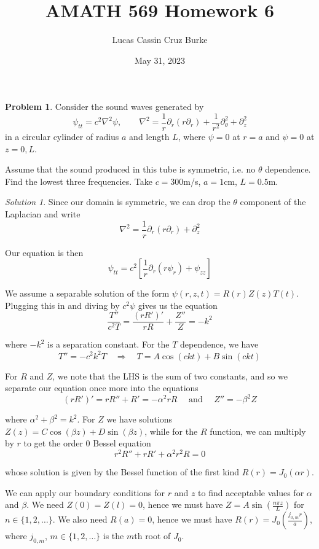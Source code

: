 \documentclass[12pt,a4paper]{article}
\title{AMATH 569 Homework 6}
\author{Lucas Cassin Cruz Burke}
\date{May 31, 2023}
\theoremstyle{definition}
\newtheorem{problem}{Problem}
\theoremstyle{remark}
\newtheorem*{solution}{Solution}
\begin{document}
\maketitle

\begin{problem}
    Consider the sound waves generated by $$\psi_{tt} = c^2 \nabla^2 \psi, \qquad \nabla^2 = \frac{1}{r} \partial_r (r \partial_r) + \frac{1}{r^2}\partial_\theta^2 + \partial_z^2$$
    in a circular cylinder of radius $a$ and length $L$, where $\psi = 0$ at $r=a$ and $\psi=0$ at $z=0, L$. 

    Assume that the sound produced in this tube is symmetric, i.e. no $\theta$ dependence. Find the lowest three frequencies. Take $c=300$m/s, $a = 1$cm, $L =0.5$m. 
\end{problem}
\begin{solution}
    Since our domain is symmetric, we can drop the $\theta$ component of the Laplacian and write $$\nabla^2 = \frac{1}{r}\partial_r (r \partial_r) + \partial_z^2$$

    Our equation is then $$\psi_{tt} = c^2 \left[ \frac{1}{r}\partial_r (r \psi_r) + \psi_{zz} \right]$$

    We assume a separable solution of the form $\psi(r, z, t) = R(r) Z(z) T(t)$. Plugging this in and diving by $c^2 \psi$ gives us the equation $$\frac{T''}{c^2T} =  \frac{(rR')'}{rR} + \frac{Z''}{Z} = -k^2$$
    
    where $-k^2$ is a separation constant. For the $T$ dependence, we have $$T'' = -c^2 k^2 T \quad \Rightarrow \quad T = A \cos (ck t) + B \sin (ckt)$$

    For $R$ and $Z$, we note that the LHS is the sum of two constants, and so we separate our equation once more into the equations $$(rR')' = rR'' + R' = -\alpha^2 rR \quad \text{ and } \quad Z'' = -\beta^2 Z$$

    where $\alpha^2 + \beta^2 = k^2$. For $Z$ we have solutions $Z(z) = C \cos(\beta z) + D \sin (\beta z)$, while for the $R$ function, we can multiply by $r$ to get the order 0 Bessel equation $$r^2 R'' + rR' + \alpha^2 r^2 R = 0$$

    whose solution is given by the Bessel function of the first kind $R(r) = J_0(\alpha r)$.

    We can apply our boundary conditions for $r$ and $z$ to find acceptable values for $\alpha$ and $\beta$. We need $Z(0) = Z(l) = 0$, hence we must have $Z = A \sin (\frac{n \pi z}{L})$ for $n \in \{1, 2, \dots\}$. We also need $R(a) = 0$, hence we must have $R(r) = J_0(\frac{j_{0,m} r}{a})$, where $j_{0,m}$, $m \in \{1, 2, \dots\}$ is the $m$th root of $J_0$. 


\end{solution}
\end{document}
